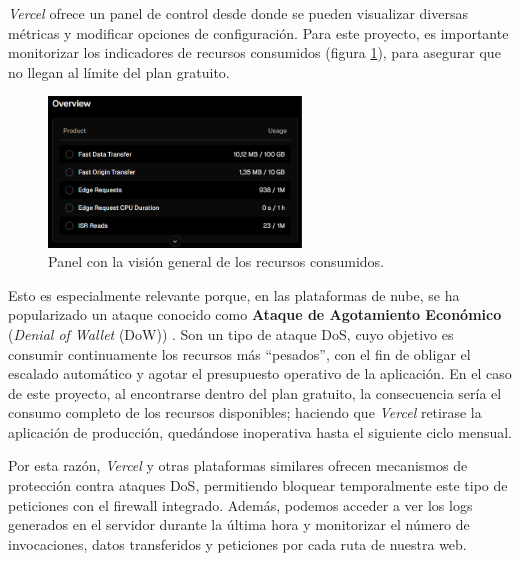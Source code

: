 \textit{Vercel} ofrece un panel de control desde donde se pueden visualizar diversas métricas y modificar opciones de configuración. Para este proyecto, es importante monitorizar los indicadores de recursos consumidos (figura \ref{fig:usage_overview}), para asegurar que no llegan al límite del plan gratuito.

\begin{figure}[H]
    \centering
    \includegraphics[width=0.6\textwidth]{figures/despliegue/usage_overview.png}
    \caption{Panel con la visión general de los recursos consumidos.}
    \label{fig:usage_overview}
\end{figure}

\newpage

Esto es especialmente relevante porque, en las plataformas de nube, se ha popularizado un ataque conocido como \textbf{Ataque de Agotamiento Económico} (\textit{Denial of Wallet} (DoW)) \cite{vercelDoW2025}. Son un tipo de ataque DoS, cuyo objetivo es consumir continuamente los recursos más ``pesados'', con el fin de obligar el escalado automático y agotar el presupuesto operativo de la aplicación. En el caso de este proyecto, al encontrarse dentro del plan gratuito, la consecuencia sería el consumo completo de los recursos disponibles; haciendo que \textit{Vercel} retirase la aplicación de producción, quedándose inoperativa hasta el siguiente ciclo mensual.

Por esta razón, \textit{Vercel} y otras plataformas similares ofrecen mecanismos de protección contra ataques DoS, permitiendo bloquear temporalmente este tipo de peticiones con el firewall integrado. Además, podemos acceder a ver los logs generados en el servidor durante la última hora y monitorizar el número de invocaciones, datos transferidos y peticiones por cada ruta de nuestra web.


